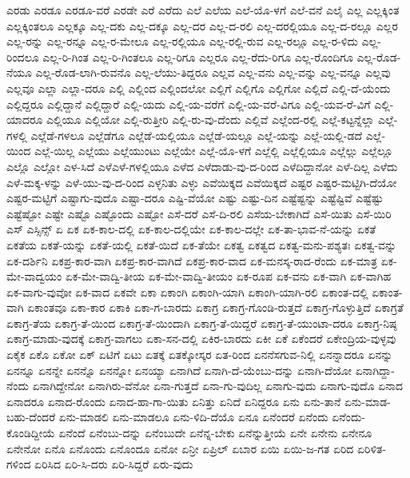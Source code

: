 {ಎರಡು
ಎರಡೂ
ಎರಡೂ-ವರೆ
ಎರಡೇ
ಎರೆ
ಎರೆದು
ಎಲೆ
ಎಲೆಯ
ಎಲೆ-ಯೊ-ಳಗೆ
ಎಲೆ-ವನೆ
ಎಲೈ
ಎಲ್ಲ
ಎಲ್ಲಕ್ಕಿಂತ
ಎಲ್ಲಕ್ಕಿಂತಲೂ
ಎಲ್ಲಕ್ಕೂ
ಎಲ್ಲ-ದಕು
ಎಲ್ಲ-ದಕ್ಕೂ
ಎಲ್ಲ-ದರ
ಎಲ್ಲ-ದ-ರಲಿ
ಎಲ್ಲ-ದರಲ್ಲಿಯೂ
ಎಲ್ಲ-ದ-ರಲ್ಲೂ
ಎಲ್ಲರ
ಎಲ್ಲ-ರನ್ನು
ಎಲ್ಲ-ರನ್ನೂ
ಎಲ್ಲ-ರ-ಮೇಲೂ
ಎಲ್ಲ-ರಲ್ಲಿಯೂ
ಎಲ್ಲ-ರಲ್ಲಿ-ರುವ
ಎಲ್ಲ-ರಲ್ಲೂ
ಎಲ್ಲ-ರ-ಳಿದು
ಎಲ್ಲ-ರಿಂದಲೂ
ಎಲ್ಲ-ರಿ-ಗಿಂತ
ಎಲ್ಲ-ರಿ-ಗಿಂತಲೂ
ಎಲ್ಲ-ರಿಗೂ
ಎಲ್ಲರೂ
ಎಲ್ಲ-ರೆದು-ರಿಗೂ
ಎಲ್ಲ-ರೊಂದಿಗೂ
ಎಲ್ಲ-ರೊಡ-ನೆಯೂ
ಎಲ್ಲ-ರೊಡ-ಲಾಗಿ-ರುವನೊ
ಎಲ್ಲ-ಲೆಯು-ತಿದ್ದರೂ
ಎಲ್ಲವ
ಎಲ್ಲ-ವನು
ಎಲ್ಲ-ವನ್ನು
ಎಲ್ಲ-ವನ್ನೂ
ಎಲ್ಲವು
ಎಲ್ಲವೂ
ಎಲ್ಲಾ
ಎಲ್ಲಾ-ದರೂ
ಎಲ್ಲಿ
ಎಲ್ಲಿಂದ
ಎಲ್ಲಿಂದಲೋ
ಎಲ್ಲಿಗೆ
ಎಲ್ಲಿಗೊ
ಎಲ್ಲಿಗೋ
ಎಲ್ಲಿದೆ
ಎಲ್ಲಿ-ದೆ-ಯೆಂದು
ಎಲ್ಲಿದ್ದರೂ
ಎಲ್ಲಿದ್ದಾನೆ
ಎಲ್ಲಿದ್ದಾರೆ
ಎಲ್ಲಿ-ಯದು
ಎಲ್ಲಿ-ಯ-ವರೆಗೆ
ಎಲ್ಲಿ-ಯ-ವರೆ-ವಿಗೂ
ಎಲ್ಲಿ-ಯವ-ರೆ-ವಿಗೆ
ಎಲ್ಲಿ-ಯಾದರೂ
ಎಲ್ಲಿಯೂ
ಎಲ್ಲಿಯೋ
ಎಲ್ಲಿ-ರುತ್ತೀರಿ
ಎಲ್ಲಿ-ರು-ವು-ದೆಂದು
ಎಲ್ಲಿವೆ
ಎಲ್ಲೆಂದ-ರಲ್ಲಿ
ಎಲ್ಲೆ-ಕಟ್ಟನ್ನೆಲ್ಲಾ
ಎಲ್ಲೆ-ಗಳಲ್ಲಿ
ಎಲ್ಲೆಡೆ-ಗಳಲೂ
ಎಲ್ಲೆಡೆಗೂ
ಎಲ್ಲೆಡೆ-ಯಲ್ಲಿಯೂ
ಎಲ್ಲೆಡೆ-ಯಲ್ಲೂ
ಎಲ್ಲೆ-ಯನ್ನು
ಎಲ್ಲೆ-ಯಲ್ಲಿ-ಡದೆ
ಎಲ್ಲೆ-ಯಿಂದ
ಎಲ್ಲೆ-ಯಿಲ್ಲ
ಎಲ್ಲೆಯು
ಎಲ್ಲೆಯುಂಟು
ಎಲ್ಲೆಯೇ
ಎಲ್ಲೆ-ಯೊ-ಳಗೆ
ಎಲ್ಲೆಲ್ಲಿ
ಎಲ್ಲೆಲ್ಲಿಯೂ
ಎಲ್ಲೆಲ್ಲು
ಎಲ್ಲೆಲ್ಲೂ
ಎಲ್ಲೊ
ಎಲ್ಲೋ
ಎಳ-ಸಿದೆ
ಎಳೆಎಳೆ-ಗಳಲ್ಲಿಯೂ
ಎಳೆದ
ಎಳೆದಾಡು-ವು-ದ-ರಿಂದ
ಎಳೆದಿದ್ದಾನೋ
ಎಳೆ-ದಿಲ್ಲ
ಎಳೆದು
ಎಳೆ-ಮಕ್ಕ-ಳನ್ನು
ಎಳೆ-ಯು-ವು-ದ-ರಿಂದ
ಎಳ್ಳನಿತು
ಎಳ್ಳು
ಎವೆಯಿಕ್ಕದ
ಎವೆಯಿಕ್ಕದೆ
ಎಷ್ಟರ
ಎಷ್ಟರ-ಮಟ್ಟಿಗಿ-ದೆಯೋ
ಎಷ್ಟರ-ಮಟ್ಟಿಗೆ
ಎಷ್ಟಾಗು-ವುದೊ
ಎಷ್ಟಾ-ದರೂ
ಎಷ್ಟಿ-ವೆಯೋ
ಎಷ್ಟು
ಎಷ್ಟು-ದಿನ
ಎಷ್ಟೆಷ್ಟನ್ನು
ಎಷ್ಟೆಷ್ಟಿವೆ
ಎಷ್ಟೆಷ್ಟು
ಎಷ್ಟೆಷ್ಟೋ
ಎಷ್ಟೇ
ಎಷ್ಟೊ
ಎಷ್ಟೊಂದು
ಎಷ್ಟೋ
ಎಸೆ-ದರೆ
ಎಸೆ-ದಿ-ರಲಿ
ಎಸೆಯ-ಬೇಕಾಗಿದೆ
ಎಸೆ-ಯಿತು
ಎಸೆ-ಯಿರಿ
ಎಸ್
ಎಸ್ಸಿನ್ಸ್
ಏ
ಏಕ
ಏಕ-ಕಾಲ-ದಲ್ಲಿ
ಏಕ-ಕಾಲ-ದಲ್ಲಿಯೇ
ಏಕ-ಕಾಲ-ದಲ್ಲೇ
ಏಕ-ತಾ-ಭಾವ-ನೆ-ಯನ್ನು
ಏಕತೆ
ಏಕತೆಯ
ಏಕತೆ-ಯನ್ನು
ಏಕತೆ-ಯಲ್ಲಿ
ಏಕತೆ-ಯಿದೆ
ಏಕ-ತೆಯೇ
ಏಕತ್ವ
ಏಕತ್ವದ
ಏಕತ್ವ-ಮನು-ಪಶ್ಯತಃ
ಏಕತ್ವ-ವನ್ನು
ಏಕ-ದರ್ಶಿನಿ
ಏಕಪ್ರ-ಕಾರ-ವಾಗಿ
ಏಕಪ್ರ-ಕಾರ-ವಾಗಿದೆ
ಏಕಪ್ರ-ಕಾರ-ವಾದ
ಏಕ-ಮನಸ್ಕ-ರಾದ-ರೆಂದು
ಏಕ-ಮಾತ್ರ
ಏಕ-ಮೇ-ವಾದ್ವಯಂ
ಏಕ-ಮೇ-ವಾದ್ವಿ-ತೀಯ
ಏಕ-ಮೇ-ವಾದ್ವಿ-ತೀಯಂ
ಏಕ-ರೂಪ
ಏಕ-ವನು
ಏಕ-ವಾಗಿ
ಏಕ-ವಾಗಿಹ
ಏಕ-ವಾಗು-ವುವೋ
ಏಕ-ವಾದ
ಏಕವೇ
ಏಕಾ
ಏಕಾಂಗಿ
ಏಕಾಂಗಿ-ಯಾಗಿ
ಏಕಾಂಗಿ-ಯಾಗಿ-ರಲಿ
ಏಕಾಂತ-ದಲ್ಲಿ
ಏಕಾಂತ-ವಾಗಿ
ಏಕಾಂತವೂ
ಏಕಾ-ಕಾರ
ಏಕಾಕಿ
ಏಕಾ-ಗ-ಬಾರದು
ಏಕಾಗ್ರ
ಏಕಾಗ್ರ-ಗೊಂಡಿ-ರುತ್ತದೆ
ಏಕಾಗ್ರ-ಗೊಳ್ಳುತ್ತಿದೆ
ಏಕಾಗ್ರತೆ
ಏಕಾಗ್ರ-ತೆಯ
ಏಕಾಗ್ರ-ತೆ-ಯಿಂದ
ಏಕಾಗ್ರ-ತೆ-ಯಿಂದಾಗಿ
ಏಕಾಗ್ರ-ತೆ-ಯಿದ್ದರೆ
ಏಕಾಗ್ರ-ತೆ-ಯುಂಟಾ-ದರೂ
ಏಕಾಗ್ರ-ನಿಷ್ಠ
ಏಕಾಗ್ರ-ಮಾಡು-ವುದಕ್ಕೆ
ಏಕಾಗ್ರ-ವಾಗಲು
ಏಕಾ-ಸನ-ದಲ್ಲಿ
ಏಕಿರ-ಬಾರದು
ಏಕೀ
ಏಕೆ
ಏಕೆಂದರೆ
ಏಕೇಂದ್ರಿಯ-ವುಳ್ಳವು
ಏಕೈಕ
ಏಕೊ
ಏಕೋ
ಏಕ್
ಏಟಿಗೆ
ಏಟು
ಏತಕ್ಕೆ
ಏತಕ್ಕೋಸ್ಕರ
ಏತ-ರಿಂದ
ಏನನೆಸಗುವ-ನಿಲ್ಲಿ
ಏನನ್ನಾದರೂ
ಏನನ್ನು
ಏನನ್ನೂ
ಏನನ್ನೇ
ಏನನ್ನೊ
ಏನನ್ನೋ
ಏನಯ್ಯಾ
ಏನಾಗಿದೆ
ಏನಾಗಿ-ದೆ-ಯೆಂಬು-ದನ್ನು
ಏನಾಗಿ-ದೆಯೋ
ಏನಾಗಿದ್ದಾ-ನೆಂದು
ಏನಾಗಿದ್ದೇನೋ
ಏನಾಗಿರು-ವೆನೋ
ಏನಾ-ಗುತ್ತದೆ
ಏನಾ-ಗು-ವುದಿಲ್ಲ
ಏನಾಗು-ವುದು
ಏನಾಗು-ವುದೊ
ಏನಾದ
ಏನಾದರೂ
ಏನಾದ-ರೊಂದು
ಏನಾದ-ಹಾ-ಗಾ-ಯಿತು
ಏನಿತ್ತು
ಏನಿದೆ
ಏನಿದ್ದರೂ
ಏನು
ಏನು-ತಾನೆ
ಏನು-ಮಾಡ-ಬಹು-ದೆಂದರೆ
ಏನು-ಮಾಡಲಿ
ಏನು-ಮಾಡಲೂ
ಏನು-ಳಿದಿ-ದೆಯೊ
ಏನೂ
ಏನೆಂದರೆ
ಏನೆಂದು
ಏನೆಂದು-ಕೊಂಡಿದ್ದೀಯೆ
ಏನೆಂದೆ
ಏನೆಂಬು-ದನ್ನು
ಏನೆಂಬುದೇ
ಏನೆನ್ನ-ಬೇಕು
ಏನೆನ್ನುತ್ತೀಯೆ
ಏನೇ
ಏನೇನು
ಏನೇನೂ
ಏನೇನೋ
ಏನೊ
ಏನೊಂದು
ಏನೊಂದೂ
ಏನೋ
ಏನ್ರೀ
ಏಪ್ರಿಲ್
ಏಬಾರ
ಏಯಿ
ಏಯಿ-ಜ-ಗತ
ಏರಿದ
ಏರಿಳಿತ-ಗಳಿಂದ
ಏರಿಸಿದ
ಏರಿ-ಸಿ-ದರು
ಏರಿ-ಸಿದ್ದರೆ
ಏರು-ವುದು
}
